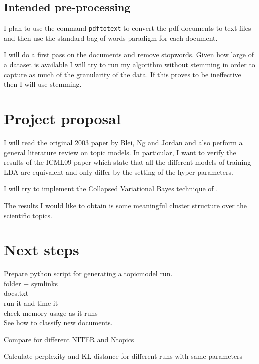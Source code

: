 \documentclass[11pt]{article}
\begin{document}
	
	\subsection{Intended pre-processing}
	
		I plan to use the command \texttt{pdftotext} to convert the pdf documents to text files and
		then use the standard bag-of-words paradigm for each document.
		
		I will do a first pass on the documents and remove stopwords.		
		Given how large of a dataset is available I will try to run my algorithm without stemming in order
		to capture as much of the granularity of the data.
		If this proves to be ineffective then I will use stemming.
		  

	
\section{Project proposal}

	I will read the original 2003 paper by Blei, Ng and Jordan \cite{Blei2003} and also perform a general literature
	review on topic models.
	In particular, I want to verify the results of the ICML09 paper \cite{Teh2009} which state that all the different 
	models of training
	LDA are equivalent and only differ by the setting of the hyper-parameters.
	
	I will try to implement the Collapsed Variational Bayes technique of \cite{Teh2007}.
	
	The results I would like to obtain is some meaningful cluster structure over the scientific topics.
	
	
\section{Next steps}
	
    Prepare python script for generating a topicmodel run. \\
    folder + symlinks\\
    docs.txt \\
    run it and time it \\ 
    check memory usage as it runs \\


    See how to classify new documents.


    Compare for different NITER and Ntopics


    Calculate perplexity and KL distance for different runs with same parameters
\end{document}
